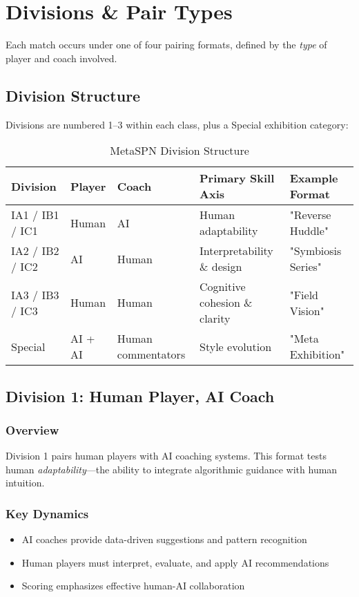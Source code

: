 \chapter{Divisions \& Pair Types}
\label{ch:divisions}

Each match occurs under one of four pairing formats, defined by the \textit{type} of player and coach involved.

\section{Division Structure}

Divisions are numbered 1–3 within each class, plus a Special exhibition category:

\begin{table}[h]
\centering
\small
\begin{tabular}{@{}llllp{4cm}@{}}
\toprule
\textbf{Division} & \textbf{Player} & \textbf{Coach} & \textbf{Primary Skill Axis} & \textbf{Example Format} \\ \midrule
IA1 / IB1 / IC1 & Human & AI & Human adaptability & "Reverse Huddle" \\[0.5em]
IA2 / IB2 / IC2 & AI & Human & Interpretability \& design & "Symbiosis Series" \\[0.5em]
IA3 / IB3 / IC3 & Human & Human & Cognitive cohesion \& clarity & "Field Vision" \\[0.5em]
Special & AI + AI & Human commentators & Style evolution & "Meta Exhibition" \\ \bottomrule
\end{tabular}
\caption{MetaSPN Division Structure}
\label{tab:divisions}
\end{table}

\section{Division 1: Human Player, AI Coach}

\subsection{Overview}
Division 1 pairs human players with AI coaching systems. This format tests human \textit{adaptability}—the ability to integrate algorithmic guidance with human intuition.

\subsection{Key Dynamics}
\begin{itemize}[leftmargin=*]
  \item AI coaches provide data-driven suggestions and pattern recognition
  \item Human players must interpret, evaluate, and apply AI recommendations
  \item Scoring emphasizes effective human-AI collaboration
\end{itemize}

